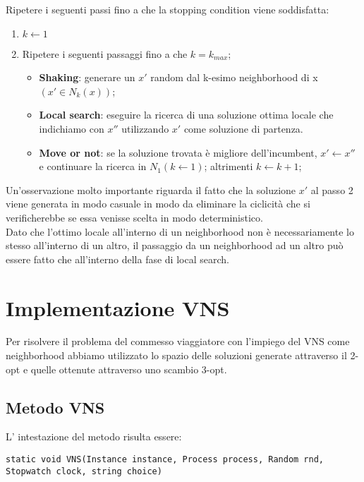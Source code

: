Ripetere i seguenti passi fino a che la stopping condition viene soddisfatta: 
\begin{enumerate}
\item $k \leftarrow 1 $
\item Ripetere i seguenti passaggi fino a che $k=k_{max}$;
\begin{itemize}
\item \textbf{Shaking}: generare un $x'$ random dal k-esimo neighborhood di x $(x' \in N_k(x))$;
\item \textbf{Local search}: eseguire la ricerca di una soluzione ottima locale che indichiamo con $x''$ utilizzando $x'$ come soluzione di partenza.
\item \textbf{Move or not}: se la soluzione trovata è migliore dell'incumbent, $x' \leftarrow x''$ e continuare la ricerca in $N_1 (k \leftarrow 1)$; altrimenti $k \leftarrow k+1$;
\end{itemize}
\end{enumerate}

Un'osservazione molto importante riguarda il fatto che la soluzione $x'$ al passo 2 viene generata in modo casuale in modo da eliminare la ciclicità che si verificherebbe se essa venisse scelta in modo deterministico.\\
Dato che l'ottimo locale all'interno di un neighborhood non è necessariamente lo stesso all'interno di un altro, il passaggio da un neighborhood ad un altro può essere fatto che all'interno della fase di local search.

 




\section{Implementazione VNS}

Per risolvere il problema del commesso viaggiatore con l'impiego del VNS come neighborhood abbiamo utilizzato lo spazio delle soluzioni generate attraverso il 2-opt e quelle ottenute attraverso uno scambio 3-opt.

\subsection{Metodo VNS}

L' intestazione del metodo risulta essere:

\begin{lstlisting}
static void VNS(Instance instance, Process process, Random rnd, Stopwatch clock, string choice)
\end{lstlisting}

